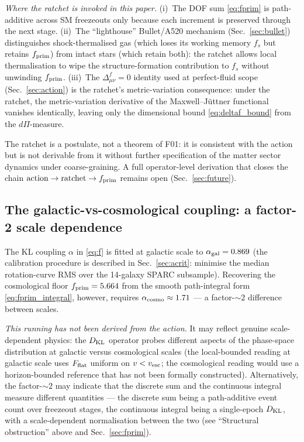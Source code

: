 \documentclass[aps,prd,twocolumn,nofootinbib,floatfix,superscriptaddress]{revtex4-2}
\newcommand{\fprim}{f_{\rm prim}}
\begin{document}
\emph{Where the ratchet is invoked in this paper.} (i)~The DOF sum
\eqref{eq:fprim} is path-additive across SM freezeouts only because
each increment is preserved through the next stage. (ii)~The
``lighthouse'' Bullet/A520 mechanism (Sec.~\ref{sec:bullet})
distinguishes shock-thermalised gas (which loses its working memory
$f_s$ but retains $\fprim$) from intact stars (which retain both):
the ratchet allows local thermalisation to wipe the structure-formation
contribution to $f_s$ without unwinding $\fprim$. (iii)~The
$\Delta^f_{\mu\nu} = 0$ identity used at perfect-fluid scope
(Sec.~\ref{sec:action}) is the ratchet's metric-variation
consequence: under the ratchet, the metric-variation derivative of
the Maxwell--J\"uttner functional vanishes identically, leaving only
the dimensional bound \eqref{eq:deltaf_bound} from the
$d\Pi$-measure.

The ratchet is a postulate, not a theorem of F01: it is consistent
with the action but is not derivable from it without further
specification of the matter sector dynamics under coarse-graining.
A full operator-level derivation that closes the chain
$\text{action} \to \text{ratchet} \to \fprim$ remains open
(Sec.~\ref{sec:future}).

\subsection{The galactic-vs-cosmological coupling: a factor-2 scale dependence}
\label{sec:alpha_scale}

The KL coupling $\alpha$ in \eqref{eq:f} is fitted at galactic scale
to $\alpha_{\rm gal} = 0.869$ (the calibration procedure is described
in Sec.~\ref{sec:acrit}: minimise the median rotation-curve RMS
over the 14-galaxy SPARC subsample). Recovering the cosmological
floor $\fprim = 5.664$ from the smooth path-integral form
\eqref{eq:fprim_integral}, however, requires
$\alpha_{\rm cosmo} \approx 1.71$ --- a factor-$\sim 2$ difference
between scales.

\emph{This running has not been derived from the action.} It may
reflect genuine scale-dependent physics: the $D_{\rm KL}$ operator
probes different aspects of the phase-space distribution at
galactic versus cosmological scales (the local-bounded reading at
galactic scale uses $F_{\rm flat}$ uniform on $v < v_{\rm esc}$;
the cosmological reading would use a horizon-bounded reference
that has not been formally constructed). Alternatively, the
factor-$\sim 2$ may indicate that the discrete sum and the
continuous integral measure different quantities --- the discrete
sum being a path-additive event count over freezeout stages, the
continuous integral being a single-epoch $D_{\rm KL}$, with a
scale-dependent normalisation between the two (see ``Structural
obstruction'' above and Sec.~\ref{sec:fprim}).
\end{document}
